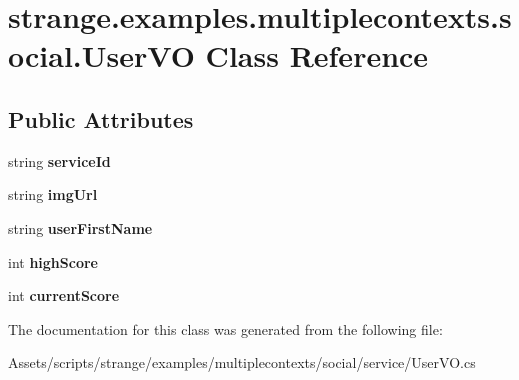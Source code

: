 \hypertarget{classstrange_1_1examples_1_1multiplecontexts_1_1social_1_1_user_v_o}{\section{strange.\-examples.\-multiplecontexts.\-social.\-User\-V\-O Class Reference}
\label{classstrange_1_1examples_1_1multiplecontexts_1_1social_1_1_user_v_o}
}
\subsection*{Public Attributes}
\begin{DoxyCompactItemize}
\item 
\hypertarget{classstrange_1_1examples_1_1multiplecontexts_1_1social_1_1_user_v_o_ab7a0d18e08950947f082ff66dc04fc3c}{string {\bfseries service\-Id}}\label{classstrange_1_1examples_1_1multiplecontexts_1_1social_1_1_user_v_o_ab7a0d18e08950947f082ff66dc04fc3c}

\item 
\hypertarget{classstrange_1_1examples_1_1multiplecontexts_1_1social_1_1_user_v_o_a2b36129c5719975bc285a8fef4a14c1f}{string {\bfseries img\-Url}}\label{classstrange_1_1examples_1_1multiplecontexts_1_1social_1_1_user_v_o_a2b36129c5719975bc285a8fef4a14c1f}

\item 
\hypertarget{classstrange_1_1examples_1_1multiplecontexts_1_1social_1_1_user_v_o_af86fc4c93783422c2b9aca5ebaa85a05}{string {\bfseries user\-First\-Name}}\label{classstrange_1_1examples_1_1multiplecontexts_1_1social_1_1_user_v_o_af86fc4c93783422c2b9aca5ebaa85a05}

\item 
\hypertarget{classstrange_1_1examples_1_1multiplecontexts_1_1social_1_1_user_v_o_ad5114a13bb9a895de6ed4b24deec3197}{int {\bfseries high\-Score}}\label{classstrange_1_1examples_1_1multiplecontexts_1_1social_1_1_user_v_o_ad5114a13bb9a895de6ed4b24deec3197}

\item 
\hypertarget{classstrange_1_1examples_1_1multiplecontexts_1_1social_1_1_user_v_o_aeea902c59d2bebcc6e1d5e77fe707343}{int {\bfseries current\-Score}}\label{classstrange_1_1examples_1_1multiplecontexts_1_1social_1_1_user_v_o_aeea902c59d2bebcc6e1d5e77fe707343}

\end{DoxyCompactItemize}


The documentation for this class was generated from the following file\-:\begin{DoxyCompactItemize}
\item 
Assets/scripts/strange/examples/multiplecontexts/social/service/User\-V\-O.\-cs\end{DoxyCompactItemize}
